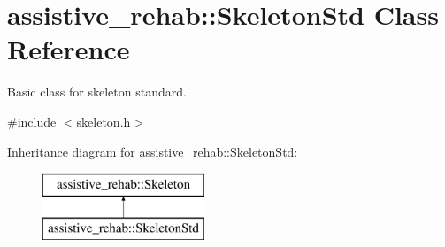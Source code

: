 \section{assistive\+\_\+rehab\+:\+:Skeleton\+Std Class Reference}
\label{classassistive__rehab_1_1SkeletonStd}


Basic class for skeleton standard.  




{\ttfamily \#include $<$skeleton.\+h$>$}

Inheritance diagram for assistive\+\_\+rehab\+:\+:Skeleton\+Std\+:\begin{figure}[H]
\begin{center}
\leavevmode
\includegraphics[height=2.000000cm]{classassistive__rehab_1_1SkeletonStd}
\end{center}
\end{figure}
